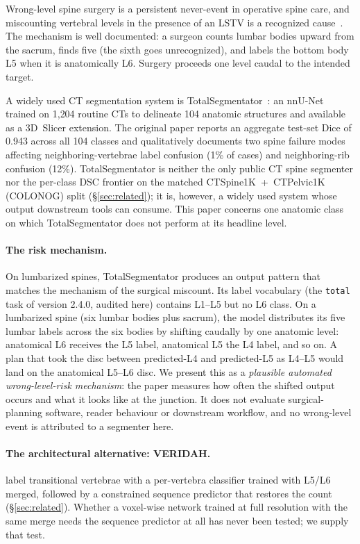 \documentclass{article}
\newcommand{\TS}{TotalSegmentator}
\newcommand{\SOTA}{TotalSegmentator}
\newcommand{\VERIDAH}{VERIDAH}
\begin{document}
Wrong-level spine surgery is a persistent never-event in
operative spine care, and miscounting vertebral levels in
the presence of an LSTV is a recognized
cause~\citep{Konin2010LumbosacralRelevance,Carrino2011EffectImaging}.
The mechanism is well documented: a surgeon counts lumbar bodies upward from
the sacrum, finds five (the sixth goes unrecognized), and
labels the bottom body L5 when it is anatomically L6. Surgery
proceeds one level caudal to the intended target.

A widely used CT segmentation system is
\TS{}~\citep{Wasserthal2023TotalSegmentator:Images}: an
nnU-Net trained on 1{,}204 routine CTs to delineate 104
anatomic structures and available as a 3D~Slicer
extension. The original paper reports an aggregate
test-set Dice of 0.943 across all 104 classes and
qualitatively documents two spine failure modes
affecting neighboring-vertebrae label confusion (1\%
of cases) and neighboring-rib confusion (12\%). \TS{} is neither the
only public CT spine segmenter nor the per-class DSC
frontier on the matched CTSpine1K~+~CTPelvic1K (COLONOG)
split (\S\ref{sec:related}); it is, however, a widely
used system whose output downstream tools can consume. This paper
concerns one anatomic class on which \TS{} does not
perform at its headline level.

\paragraph{The risk mechanism.}
On lumbarized spines, \SOTA{} produces an output pattern
that matches the mechanism of the surgical miscount. Its
label vocabulary (the \texttt{total} task of version 2.4.0,
audited here) contains L1--L5 but no L6 class. On a
lumbarized spine (six lumbar bodies plus sacrum), the model
distributes its five lumbar labels across the six bodies by
shifting caudally by one anatomic level: anatomical L6
receives the L5 label, anatomical L5 the L4 label, and so
on. A plan
that took the disc between predicted-L4 and predicted-L5
as L4--L5 would land on the anatomical L5--L6 disc. We
present this as a \emph{plausible automated
wrong-level-risk mechanism}: the paper measures how often
the shifted output occurs and what it looks like at the
junction. It does not evaluate surgical-planning software,
reader behaviour or downstream workflow, and no
wrong-level event is attributed to a segmenter here.

\paragraph{The architectural alternative: \VERIDAH{}.}
\citet{Moller2026VERIDAH:Sequences} label transitional
vertebrae with a per-vertebra classifier trained with
L5/L6 merged, followed by a constrained sequence predictor
that restores the count (\S\ref{sec:related}). Whether a
voxel-wise network trained at full resolution with the same
merge needs the sequence predictor at all has never been
tested; we supply that test.
\end{document}
